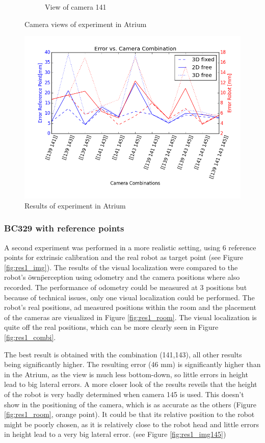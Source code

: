 \begin{figure}[H]
\begin{subfigure}{0.4\linewidth}
        \caption{View of camera 141 }
        \label{fig:res0_img141}
    \end{subfigure}
    \caption{Camera views of experiment in Atrium}
    \label{fig:res0_views}
\end{figure}

\begin{figure}[H] 
    \centering
    \includegraphics[width=.8\linewidth]{files/res0_combi_4.png}
    \caption{Results of experiment in Atrium}
    \label{fig:res0_err}
\end{figure}

\newpage
\subsubsection{BC329 with reference points}

A second experiment was performed in a more realistic setting, using 6 reference points for extrinsic calibration and the real robot as target point (see Figure \ref{fig:res1_img}). 
The results of the visual localization were compared to the robot's \"own\" perception using odometry and the camera positions where also recorded.
The performance of odometry could be measured at 3 positions but because of technical issues, only one visual localization could be performed. 
The robot's real positions, ad measured positions within the room and the placement of the cameras are visualized in Figure \ref{fig:res1_room}.
The visual localization is quite off the real positions, which can be more clearly seen in Figure \ref{fig:res1_combi}. 

The best result is obtained with the combination (141,143), all other results being significantly higher. 
The resulting error (46 mm) is significantly higher than in the Atrium, as the view is much less bottom-down, so little errors in height lead to big lateral errors.
A more closer look of the results reveils that the height of the robot is very badly determined when camera 145 is used. This doesn't show in the positioning of the camera, which is as accurate as the others (Figure \ref{fig:res1_room}, orange point). 
It could be that its relative position to the robot might be poorly chosen, as it is relatively close to the robot head and little errors in height lead to a very big lateral error. (see Figure \ref{fig:res1_img145})

